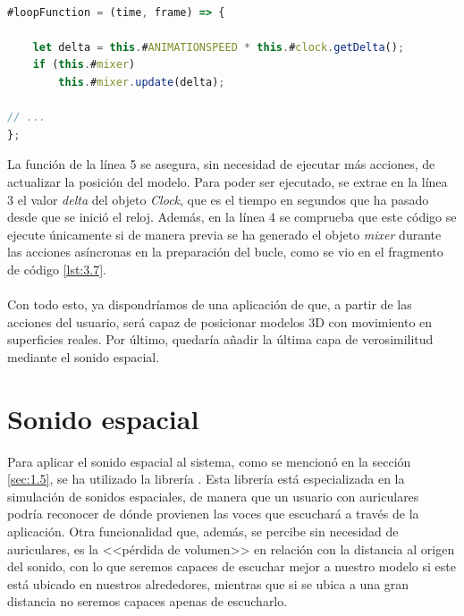 \documentclass{subfiles}
\begin{document}
\paragraph{}
\begin{lstlisting}[language=JavaScript, caption={Actualización de la posición del modelo 3D antes de renderizar.}, label={lst:3.9}]
#loopFunction = (time, frame) => {

    let delta = this.#ANIMATIONSPEED * this.#clock.getDelta();
    if (this.#mixer)
        this.#mixer.update(delta);

// ...
};
\end{lstlisting}

        La función de la línea 5 se asegura, sin necesidad de ejecutar más acciones, de actualizar la posición del modelo. Para poder ser ejecutado, se extrae en la línea 3 el valor \textit{delta} del objeto \textit{Clock}, que es el tiempo en segundos que ha pasado desde que se inició el reloj. Además, en la línea 4 se comprueba que este código se ejecute únicamente si de manera previa se ha generado el objeto \textit{mixer} durante las acciones asíncronas en la preparación del bucle, como se vio en el fragmento de código \ref{lst:3.7}.
        
        \paragraph{}
        Con todo esto, ya dispondríamos de una aplicación de \ra que, a partir de las acciones del usuario, será capaz de posicionar modelos 3D con movimiento en superficies reales. Por último, quedaría añadir la última capa de verosimilitud mediante el sonido espacial.

        \section{Sonido espacial}
        \label{sec:3.4}
        Para aplicar el sonido espacial al sistema, como se mencionó en la sección \ref{sec:1.5}, se ha utilizado la librería \resonanceaudio \cite{web:resonance_audio}. Esta librería está especializada en la simulación de sonidos espaciales, de manera que un usuario con auriculares podría reconocer de dónde provienen las voces que escuchará a través de la aplicación. Otra funcionalidad que, además, se percibe sin necesidad de auriculares, es la <<pérdida de volumen>> en relación con la distancia al origen del sonido, con lo que seremos capaces de escuchar mejor a nuestro modelo si este está ubicado en nuestros alrededores, mientras que si se ubica a una gran distancia no seremos capaces apenas de escucharlo.
\end{document}
